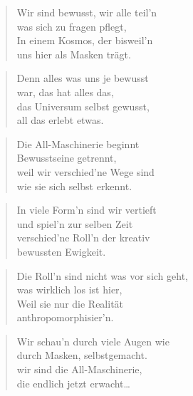 \documentclass[10pt,a4paper]{article}
\begin{document}
\begin{paracol}{2}
\begin{verse}
Wir sind bewusst, wir alle teil’n \\
was sich zu fragen pflegt, \\
In einem Kosmos, der bisweil’n \\
uns hier als Masken trägt. \\
\end{verse}

\begin{verse}
Denn alles was uns je bewusst \\
war, das hat alles das, \\
das Universum selbst gewusst, \\
all das erlebt etwas. \\
\end{verse}

\begin{verse}
Die All-Maschinerie beginnt \\
Bewusstseine getrennt, \\
weil wir verschied’ne Wege sind \\
wie sie sich selbst erkennt. \\
\end{verse}

\begin{verse}
In viele Form’n sind wir vertieft \\
und spiel’n zur selben Zeit \\
verschied’ne Roll’n der kreativ \\
bewussten Ewigkeit. \\
\end{verse}

\begin{verse}
Die Roll’n sind nicht was vor sich geht, \\
was wirklich los ist hier, \\
Weil sie nur die Realität \\
anthropomorphisier’n. \\
\end{verse}

\begin{verse}
Wir schau’n durch viele Augen wie \\
durch Masken, selbstgemacht. \\
wir sind die All-Maschinerie, \\
die endlich jetzt erwacht… \\
\end{verse}


\end{paracol}
\end{document}
